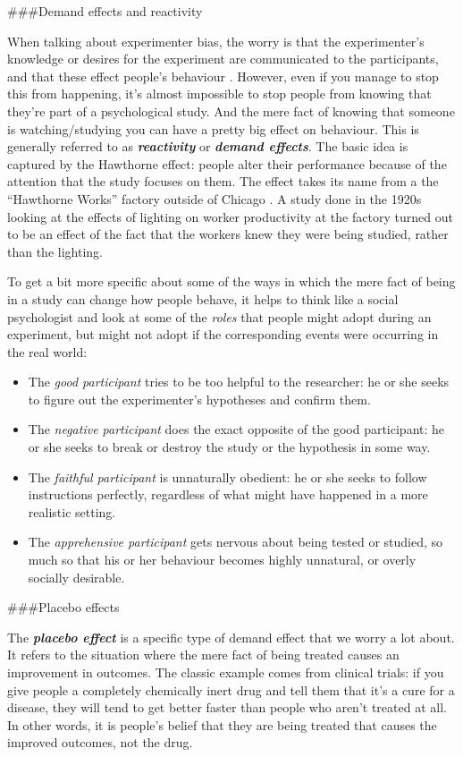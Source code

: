 \documentclass[]{book}
\providecommand{\tightlist}{%
  \setlength{\itemsep}{0pt}\setlength{\parskip}{0pt}}
\begin{document}
\#\#\#Demand effects and reactivity

When talking about experimenter bias, the worry is that the experimenter's knowledge or desires for the experiment are communicated to the participants, and that these effect people's behaviour \citep{Rosenthal1966}. However, even if you manage to stop this from happening, it's almost impossible to stop people from knowing that they're part of a psychological study. And the mere fact of knowing that someone is watching/studying you can have a pretty big effect on behaviour. This is generally referred to as \textbf{\emph{reactivity}} or \textbf{\emph{demand effects}}. The basic idea is captured by the Hawthorne effect: people alter their performance because of the attention that the study focuses on them. The effect takes its name from a the ``Hawthorne Works'' factory outside of Chicago \citep[see][]{Adair1984}. A study done in the 1920s looking at the effects of lighting on worker productivity at the factory turned out to be an effect of the fact that the workers knew they were being studied, rather than the lighting.

To get a bit more specific about some of the ways in which the mere fact of being in a study can change how people behave, it helps to think like a social psychologist and look at some of the \emph{roles} that people might adopt during an experiment, but might not adopt if the corresponding events were occurring in the real world:

\begin{itemize}
\tightlist
\item
  The \emph{good participant} tries to be too helpful to the researcher: he or she seeks to figure out the experimenter's hypotheses and confirm them.
\item
  The \emph{negative participant} does the exact opposite of the good participant: he or she seeks to break or destroy the study or the hypothesis in some way.
\item
  The \emph{faithful participant} is unnaturally obedient: he or she seeks to follow instructions perfectly, regardless of what might have happened in a more realistic setting.
\item
  The \emph{apprehensive participant} gets nervous about being tested or studied, so much so that his or her behaviour becomes highly unnatural, or overly socially desirable.
\end{itemize}

\#\#\#Placebo effects

The \textbf{\emph{placebo effect}} is a specific type of demand effect that we worry a lot about. It refers to the situation where the mere fact of being treated causes an improvement in outcomes. The classic example comes from clinical trials: if you give people a completely chemically inert drug and tell them that it's a cure for a disease, they will tend to get better faster than people who aren't treated at all. In other words, it is people's belief that they are being treated that causes the improved outcomes, not the drug.
\end{document}
